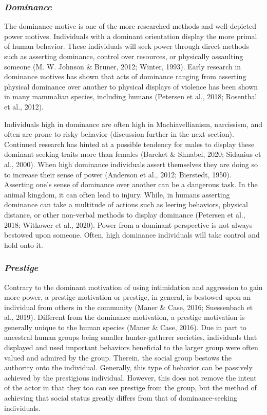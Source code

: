 \documentclass[
  donotrepeattitle,doc, 12pt, a4paper,floatsintext]{apa7}
\begin{document}
\hypertarget{dominance}{%
\subsubsection{\texorpdfstring{\emph{Dominance}}{Dominance}}\label{dominance}}

The dominance motive is one of the more researched methods and well-depicted power motives. Individuals with a dominant orientation display the more primal of human behavior. These individuals will seek power through direct methods such as asserting dominance, control over resources, or physically assaulting someone (M. W. Johnson \& Bruner, 2012; Winter, 1993). Early research in dominance motives has shown that acts of dominance ranging from asserting physical dominance over another to physical displays of violence has been shown in many mammalian species, including humans (Petersen et al., 2018; Rosenthal et al., 2012).

Individuals high in dominance are often high in Machiavellianism, narcissism, and often are prone to risky behavior (discussion further in the next section). Continued research has hinted at a possible tendency for males to display these dominant seeking traits more than females (Bareket \& Shnabel, 2020; Sidanius et al., 2000). When high dominance individuals assert themselves they are doing so to increase their sense of power (Anderson et al., 2012; Bierstedt, 1950). Asserting one's sense of dominance over another can be a dangerous task. In the animal kingdom, it can often lead to injury. While, in humans asserting dominance can take a multitude of actions such as leering behaviors, physical distance, or other non-verbal methods to display dominance (Petersen et al., 2018; Witkower et al., 2020). Power from a dominant perspective is not always bestowed upon someone. Often, high dominance individuals will take control and hold onto it.

\hypertarget{prestige}{%
\subsubsection{\texorpdfstring{\emph{Prestige}}{Prestige}}\label{prestige}}

Contrary to the dominant motivation of using intimidation and aggression to gain more power, a prestige motivation or prestige, in general, is bestowed upon an individual from others in the community (Maner \& Case, 2016; Suessenbach et al., 2019). Different from the dominance motivation, a prestige motivation is generally unique to the human species (Maner \& Case, 2016). Due in part to ancestral human groups being smaller hunter-gatherer societies, individuals that displayed and used important behaviors beneficial to the larger group were often valued and admired by the group. Therein, the social group bestows the authority onto the individual. Generally, this type of behavior can be passively achieved by the prestigious individual. However, this does not remove the intent of the actor in that they too can see prestige from the group, but the method of achieving that social status greatly differs from that of dominance-seeking individuals.\\
\end{document}
